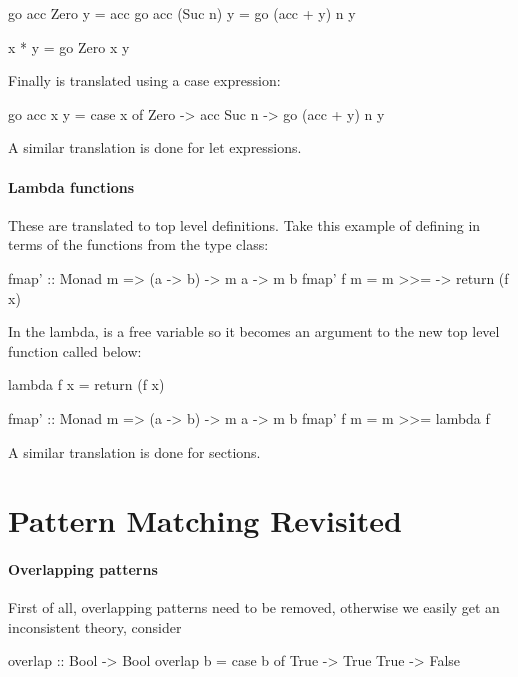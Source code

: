 \begin{code}
go acc Zero    y = acc
go acc (Suc n) y = go (acc + y) n y

x * y = go Zero x y
\end{code}

\noindent
Finally  is translated using a case expression:

\begin{code}
go acc x y = case x of
     Zero  -> acc
     Suc n -> go (acc + y) n y
\end{code}

A similar translation is done for let expressions.

\paragraph{Lambda functions} These are translated to top level
definitions. Take this example of defining  in terms of the
functions from the  type class:

\begin{code}
fmap' :: Monad m => (a -> b) -> m a -> m b
fmap' f m = m >>= \x -> return (f x)
\end{code}

\noindent
In the lambda,  is a free variable so it becomes an argument to
the new top level function called  below:

\begin{code}
lambda f x = return (f x)

fmap' :: Monad m => (a -> b) -> m a -> m b
fmap' f m = m >>= lambda f
\end{code}

A similar translation is done for sections.

\section{Pattern Matching Revisited}

\paragraph{Overlapping patterns} First of all, overlapping patterns need to be removed, otherwise we
easily get an inconsistent theory, consider

\begin{code}
overlap :: Bool -> Bool
overlap b = case b of
              True -> True
              True -> False
\end{code}

